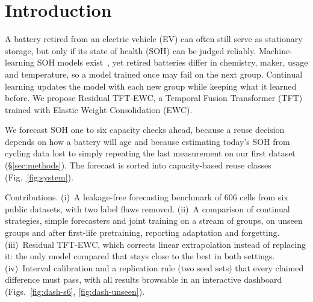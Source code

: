 
\section{Introduction}

A battery retired from an electric vehicle (EV) can often still serve as stationary storage, but only if its state of health (SOH) can be judged reliably. Machine-learning SOH models exist~\cite{ref1,ref2,ref3,ref4}, yet retired batteries differ in chemistry, maker, usage and temperature, so a model trained once may fail on the next group. Continual learning updates the model with each new group while keeping what it learned before. We propose Residual TFT-EWC, a Temporal Fusion Transformer (TFT) trained with Elastic Weight Consolidation (EWC).

We forecast SOH one to six capacity checks ahead, because a reuse decision depends on how a battery will age and because estimating today's SOH from cycling data lost to simply repeating the last measurement on our first dataset (\S\ref{sec:methods}). The forecast is sorted into capacity-based reuse classes (Fig.~\ref{fig:system}).



Contributions.
(i)~A leakage-free forecasting benchmark of 606 cells from six public datasets, with two label flaws removed.
(ii)~A comparison of continual strategies, simple forecasters and joint training on a stream of groups, on unseen groups and after first-life pretraining, reporting adaptation and forgetting.
(iii)~Residual TFT-EWC, which corrects linear extrapolation instead of replacing it: the only model compared that stays close to the best in both settings.
(iv)~Interval calibration and a replication rule (two seed sets) that every claimed difference must pass, with all results browsable in an interactive dashboard (Figs.~\ref{fig:dash-s6}, \ref{fig:dash-unseen}).
